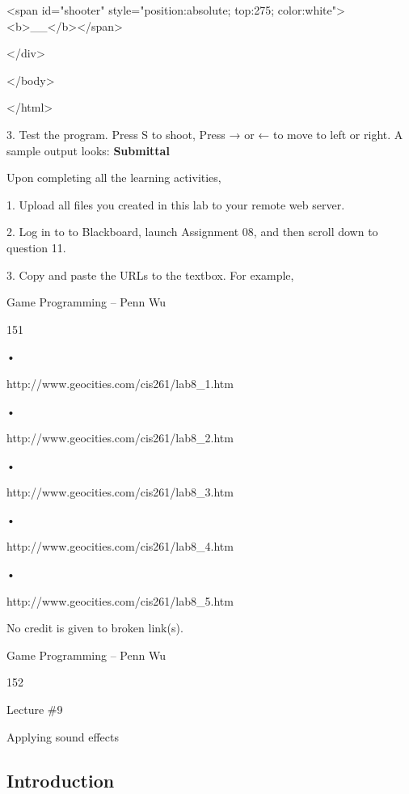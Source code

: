 \documentclass[
]{article}
\begin{document}
\textless span id="shooter" style="position:absolute; top:275;
color:white"\textgreater\textless b\textgreater\_\textbar\_\textless/b\textgreater\textless/span\textgreater{}

\textless/div\textgreater{}

\textless/body\textgreater{}

\textless/html\textgreater{}

3. Test the program. Press S to shoot, Press → or ← to move to left or
right. A sample output looks: \textbf{Submittal}

Upon completing all the learning activities,

1. Upload all files you created in this lab to your remote web server.

2. Log in to to Blackboard, launch Assignment 08, and then scroll down
to question 11.

3. Copy and paste the URLs to the textbox. For example,

Game Programming -- Penn Wu

151

\protect\hypertarget{index_split_009.htmlux5cux23p152}{}{}•

http://www.geocities.com/cis261/lab8\_1.htm

•

http://www.geocities.com/cis261/lab8\_2.htm

•

http://www.geocities.com/cis261/lab8\_3.htm

•

http://www.geocities.com/cis261/lab8\_4.htm

•

http://www.geocities.com/cis261/lab8\_5.htm

No credit is given to broken link(s).

Game Programming -- Penn Wu

152

\protect\hypertarget{index_split_009.htmlux5cux23p153}{}{}

Lecture \#9

Applying sound effects

\protect\hypertarget{index_split_010.html}{}{}

\hypertarget{index_split_010.htmlux5cux23calibre_pb_9}{%
\subsection{Introduction}\label{index_split_010.htmlux5cux23calibre_pb_9}}
\end{document}
